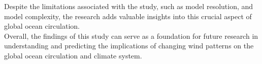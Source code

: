 \documentclass[12pt]{article}
\begin{document}
\noindent Despite the limitations associated with the study, such as model resolution, and model complexity, the research adds valuable insights into this crucial aspect of global ocean circulation.\\

\noindent Overall, the findings of this study can serve as a foundation for future research in understanding and predicting the implications of changing wind patterns on the global ocean circulation and climate system.












\newpage


\end{document}
